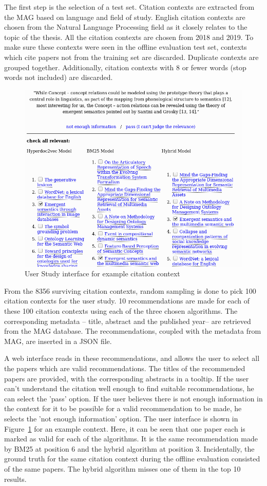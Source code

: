 The first step is the selection of a test set. Citation contexts are extracted from the MAG based on language and field of study. English citation contexts are chosen from the Natural Language Processing field as it closely relates to the topic of the thesis. All the citation contexts are chosen from 2018 and 2019. To make sure these contexts were seen in the offline evaluation test set, contexts which cite papers not from the training set are discarded. Duplicate contexts are grouped together. Additionally, citation contexts with 8 or fewer words (stop words not included) are discarded. 
\begin{figure}
    \centering
    \includegraphics[keepaspectratio, width=.8\linewidth]{figures/Evaluation/userstudyinterface.PNG}
    \caption{User Study interface for example citation context}
    \label{fig:userstudyinterface}
\end{figure}
From the 8356 surviving citation contexts, random sampling is done to pick 100 citation contexts for the user study. 10 recommendations are made for each of these 100 citation contexts using each of the three chosen algorithms. The corresponding metadata -- title, abstract and the published year-- are retrieved from the MAG database. 
The recommendations, coupled with the metadata from MAG, are inserted in a JSON file. 

A web interface reads in these recommendations, and allows the user to select all the papers which are valid recommendations. The titles of the recommended papers are provided, with the corresponding abstracts in a tooltip. If the user can't understand the citation well enough to find suitable recommendations, he can select the 'pass' option. If the user believes there is not enough information in the context for it to be possible for a valid recommendation to be made, he selects the 'not enough information' option.
The user interface is shown in Figure~\ref{fig:userstudyinterface} for an example context. Here, it can be seen that one paper each is marked as valid for each of the algorithms. It is the same recommendation made by BM25 at position 6 and the hybrid algorithm at position 3. Incidentally, the ground truth for the same citation context during the offline evaluation consisted of the same papers. The hybrid algorithm misses one of them in the top 10 results. 

